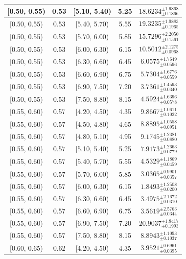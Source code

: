\begin{longtable}{|c|c|c|c|c|}
\hline
[0.50, 0.55) & 0.53 & [5.10, 5.40) & 5.25 & $18.6234^{ \pm 1.9868 }_{ \pm 0.1866 }$ \\ 
\hline
[0.50, 0.55) & 0.53 & [5.40, 5.70) & 5.55 & $19.3235^{ \pm 1.9883 }_{ \pm 0.1965 }$ \\ 
\hline
[0.50, 0.55) & 0.53 & [5.70, 6.00) & 5.85 & $15.7296^{ \pm 2.2050 }_{ \pm 0.1561 }$ \\ 
\hline
[0.50, 0.55) & 0.53 & [6.00, 6.30) & 6.15 & $10.5012^{ \pm 2.1275 }_{ \pm 0.0968 }$ \\ 
\hline
[0.50, 0.55) & 0.53 & [6.30, 6.60) & 6.45 & $6.0575^{ \pm 1.7649 }_{ \pm 0.0596 }$ \\ 
\hline
[0.50, 0.55) & 0.53 & [6.60, 6.90) & 6.75 & $5.7304^{ \pm 1.6776 }_{ \pm 0.0559 }$ \\ 
\hline
[0.50, 0.55) & 0.53 & [6.90, 7.50) & 7.20 & $3.7361^{ \pm 1.4593 }_{ \pm 0.0340 }$ \\ 
\hline
[0.50, 0.55) & 0.53 & [7.50, 8.80) & 8.15 & $4.5924^{ \pm 1.6396 }_{ \pm 0.0578 }$ \\ 
\hline
[0.55, 0.60) & 0.57 & [4.20, 4.50) & 4.35 & $9.8667^{ \pm 1.0611 }_{ \pm 0.1022 }$ \\ 
\hline
[0.55, 0.60) & 0.57 & [4.50, 4.80) & 4.65 & $8.8895^{ \pm 1.0558 }_{ \pm 0.0951 }$ \\ 
\hline
[0.55, 0.60) & 0.57 & [4.80, 5.10) & 4.95 & $9.1745^{ \pm 1.2381 }_{ \pm 0.0880 }$ \\ 
\hline
[0.55, 0.60) & 0.57 & [5.10, 5.40) & 5.25 & $7.9173^{ \pm 1.2663 }_{ \pm 0.0779 }$ \\ 
\hline
[0.55, 0.60) & 0.57 & [5.40, 5.70) & 5.55 & $4.5329^{ \pm 1.1869 }_{ \pm 0.0459 }$ \\ 
\hline
[0.55, 0.60) & 0.57 & [5.70, 6.00) & 5.85 & $3.0365^{ \pm 0.9901 }_{ \pm 0.0357 }$ \\ 
\hline
[0.55, 0.60) & 0.57 & [6.00, 6.30) & 6.15 & $1.8493^{ \pm 1.2508 }_{ \pm 0.0200 }$ \\ 
\hline
[0.55, 0.60) & 0.57 & [6.30, 6.60) & 6.45 & $3.4975^{ \pm 2.1672 }_{ \pm 0.0310 }$ \\ 
\hline
[0.55, 0.60) & 0.57 & [6.60, 6.90) & 6.75 & $3.5619^{ \pm 2.5763 }_{ \pm 0.0344 }$ \\ 
\hline
[0.55, 0.60) & 0.57 & [6.90, 7.50) & 7.20 & $20.9037^{ \pm 1.8417 }_{ \pm 0.1993 }$ \\ 
\hline
[0.55, 0.60) & 0.57 & [7.50, 8.80) & 8.15 & $8.8943^{ \pm 1.1093 }_{ \pm 0.1037 }$ \\ 
\hline
[0.60, 0.65) & 0.62 & [4.20, 4.50) & 4.35 & $3.9521^{ \pm 0.6961 }_{ \pm 0.0395 }$ \\ 

\end{longtable}
